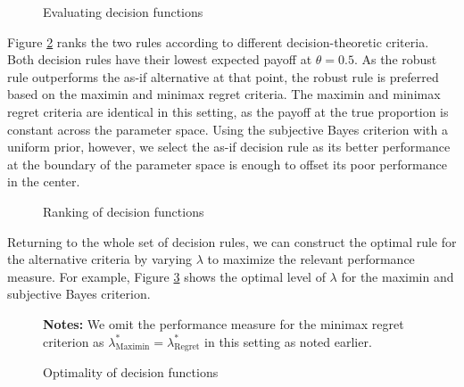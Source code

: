 \begin{figure}[h!]\centering
{}\hspace{0.3cm}
\caption{Evaluating decision functions}\label{Measurement of performance}
\end{figure}\FloatBarrier

Figure \ref{Ranking of decision rules} ranks the two rules according to different decision-theoretic criteria. Both decision rules have their lowest expected payoff at $\theta = 0.5$. As the robust rule outperforms the as-if alternative at that point, the robust rule is preferred based on the maximin and minimax regret criteria. The maximin and minimax regret criteria are identical in this setting, as the payoff at the true proportion is constant across the parameter space.   Using the subjective Bayes criterion with a uniform prior, however, we select the as-if decision rule as its better performance at the boundary of the parameter space is enough to offset its poor performance in the center.

\begin{figure}[h!]\centering
{}
\caption{Ranking of decision functions}\label{Ranking of decision rules}
\end{figure}\FloatBarrier

Returning to the whole set of decision rules, we can construct the optimal rule for the alternative criteria by varying $\lambda$ to maximize the relevant performance measure. For example, Figure \ref{Optimality of decision rules for urn} shows the optimal level of $\lambda$ for the maximin and subjective Bayes criterion.

\begin{figure}[h!]\centering
{}\vspace{-0.9cm}
\begin{center}
\begin{minipage}[t]{0.5\columnwidth}
\item \scriptsize{\textbf{Notes:} We omit the performance measure for the minimax regret criterion as $\lambda^*_{\text{Maximin}} = \lambda^*_{\text{Regret}}$ in this setting as noted earlier.}
\end{minipage}
\end{center}
\caption{Optimality of decision functions}\label{Optimality of decision rules for urn}
\end{figure}\FloatBarrier

